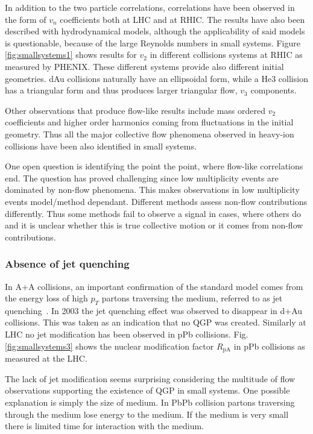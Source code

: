 In addition to the two particle correlations, correlations have been observed in the form of $v_n$ coefficients both at LHC and at RHIC. The results have also been described  with hydrodynamical models, although the applicability of said models is questionable, because of the large Reynolds numbers in small systems. Figure \ref{fig:smallsystems1} shows results for $v_2$ in different collisions systems at RHIC as measured by PHENIX. These different systems provide also different initial geometries. dAu collisions naturally have an ellipsoidal form, while a He3 collision has a triangular form and thus produces larger triangular flow, $v_3$ components. 

Other observations that produce flow-like results include mass ordered $v_2$ coefficients and higher order harmonics coming from fluctuations in the initial geometry. Thus all the major collective flow phenomena observed in heavy-ion collisions have been also identified in small systems.

One open question is identifying the point the point, where flow-like correlations end. The question has proved challenging since low multiplicity events are dominated by non-flow phenomena. This makes observations in low multiplicity events model/method dependant. Different methods assess non-flow contributions differently. Thus some methods fail to observe a signal in cases, where others do and it is unclear whether this is true collective motion or it comes from non-flow contributions.

\subsubsection{Absence of jet quenching}
In A+A collisions, an important confirmation of the standard model comes from the energy loss of high $p_T$ partons traversing the medium, referred to as jet quenching~\cite{Gyulassy:2003mc,doi:10.1146,Accardi:2009qv}. In 2003 the jet quenching effect was observed to disappear in d+Au collisions. This was taken as an indication that no QGP was created. Similarly at LHC no jet modification has been observed in pPb collisions. Fig. \ref{fig:smallsystems3} shows the nuclear modification factor $R_{\mathrm{pA}}$ in pPb collisions as measured at the LHC. 

The lack of jet modification seems surprising considering the multitude of flow observations supporting the existence of QGP in small systems. One possible explanation is simply the size of medium. In PbPb collision partons traversing through the medium lose energy to the medium. If the medium is very small there is limited time for interaction with the medium. 


